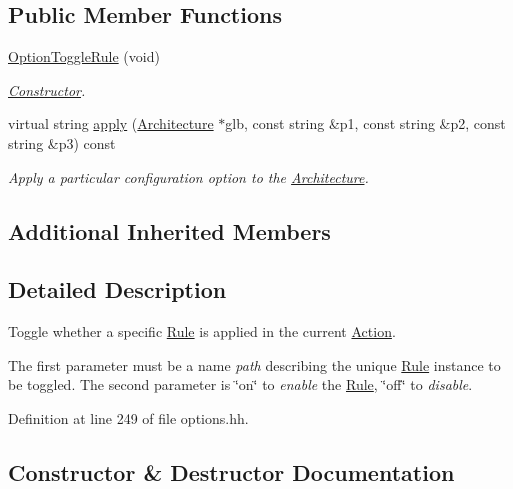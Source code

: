 \subsection*{Public Member Functions}
\begin{DoxyCompactItemize}
\item 
\mbox{\hyperlink{class_option_toggle_rule_a3bbf5ae0d4837cb041e4c83d01603f44}{Option\+Toggle\+Rule}} (void)
\begin{DoxyCompactList}\small\item\em \mbox{\hyperlink{class_constructor}{Constructor}}. \end{DoxyCompactList}\item 
virtual string \mbox{\hyperlink{class_option_toggle_rule_aa32ec58eafbd9711221d06fdc4c29b2b}{apply}} (\mbox{\hyperlink{class_architecture}{Architecture}} $\ast$glb, const string \&p1, const string \&p2, const string \&p3) const
\begin{DoxyCompactList}\small\item\em Apply a particular configuration option to the \mbox{\hyperlink{class_architecture}{Architecture}}. \end{DoxyCompactList}\end{DoxyCompactItemize}
\subsection*{Additional Inherited Members}


\subsection{Detailed Description}
Toggle whether a specific \mbox{\hyperlink{class_rule}{Rule}} is applied in the current \mbox{\hyperlink{class_action}{Action}}. 

The first parameter must be a name {\itshape path} describing the unique \mbox{\hyperlink{class_rule}{Rule}} instance to be toggled. The second parameter is \char`\"{}on\char`\"{} to {\itshape enable} the \mbox{\hyperlink{class_rule}{Rule}}, \char`\"{}off\char`\"{} to {\itshape disable}. 

Definition at line 249 of file options.\+hh.



\subsection{Constructor \& Destructor Documentation}
\mbox{\label{class_option_toggle_rule_a3bbf5ae0d4837cb041e4c83d01603f44}} 
